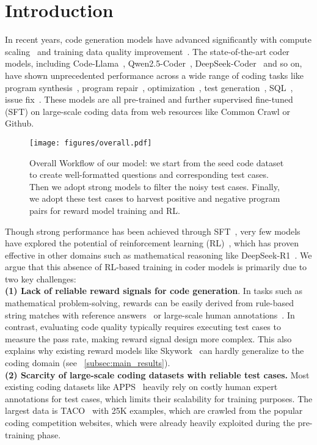\section{Introduction}
\label{sec:intro}
In recent years, code generation models have advanced significantly with compute scaling~\citep{kaplan2020scaling} and training data quality improvement~\citep{huang2024opencoder,lozhkov2024starcoder,guo2024deepseek}. The state-of-the-art coder models, including Code-Llama~\citep{codellama}, Qwen2.5-Coder~\citep{Hui2024Qwen25CoderTR}, DeepSeek-Coder~\citep{Guo2024DeepSeekCoderWT} and so on, have shown unprecedented performance across a wide range of coding tasks like program synthesis~\citep{codex}, program repair~\citep{opencodeinterpreter}, optimization~\citep{shypula2023learning}, test generation~\citep{steenhoek2023reinforcement}, SQL~\citep{spider}, issue fix~\citep{swebench}. These models are all pre-trained and further supervised fine-tuned (SFT) on large-scale coding data from web resources like Common Crawl or Github.

\begin{figure}[!t]
    \centering
    \texttt{[image: figures/overall.pdf]}
    \caption{Overall Workflow of our model: we start from the seed code dataset to create well-formatted questions and corresponding test cases. Then we adopt strong models to filter the noisy test cases. Finally, we adopt these test cases to harvest positive and negative program pairs for reward model training and RL.}
    \vspace{-3ex}
    \label{fig:overview}
\end{figure}
Though strong performance has been achieved through SFT~\citep{luo2023wizardcoder,magicoder}, very few models have explored the potential of reinforcement learning (RL)~\citep{Ouyang2022TrainingLM}, which has proven effective in other domains such as mathematical reasoning like DeepSeek-R1~\citep{Shao2024DeepSeekMathPT}. We argue that this absence of RL-based training in coder models is primarily due to two key challenges:\vspace{1ex}\\
\textbf{(1) Lack of reliable reward signals for code generation}. In tasks such as mathematical problem-solving, rewards can be easily derived from rule-based string matches with reference answers~\citep{DeepseekR1} or large-scale human annotations~\citep{instructgpt}. In contrast, evaluating code quality typically requires executing test cases to measure the pass rate, making reward signal design more complex. This also explains why existing reward models like Skywork~\citep{skywork} can hardly generalize to the coding domain (see ~\autoref{subsec:main_results}). \\
\textbf{(2) Scarcity of large-scale coding datasets with reliable test cases.} Most existing coding datasets like APPS~\citep{APPS,codex} heavily rely on costly human expert annotations for test cases, which limits their scalability for training purposes. The largest data is TACO~\citep{taco} with 25K examples, which are crawled from the popular coding competition websites, which were already heavily exploited during the pre-training phase.   
 

